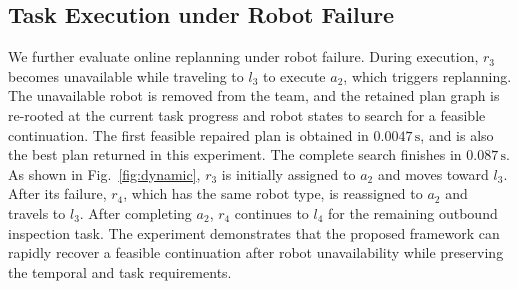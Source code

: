 \documentclass[lettersize,journal]{IEEEtran}
\theoremstyle{italiclemma}
\theoremstyle{italiclemma}
\theoremstyle{definition}
\begin{document}

\subsection{Task Execution under Robot Failure}
We further evaluate online replanning under robot failure. During execution, $r_3$ becomes unavailable while traveling to $l_3$ to execute $a_2$, which triggers replanning. The unavailable robot is removed from the team, and the retained plan graph is re-rooted at the current task progress and robot states to search for a feasible continuation. The first feasible repaired plan is obtained in $0.0047\,\mathrm{s}$, and is also the best plan returned in this experiment. The complete search finishes in $0.087\,\mathrm{s}$. As shown in Fig.~\ref{fig:dynamic}, $r_3$ is initially assigned to $a_2$ and moves toward $l_3$. After its failure, $r_4$, which has the same robot type, is reassigned to $a_2$ and travels to $l_3$. After completing $a_2$, $r_4$ continues to $l_4$ for the remaining outbound inspection task. The experiment demonstrates that the proposed framework can rapidly recover a feasible continuation after robot unavailability while preserving the temporal and  task requirements.



\end{document}
